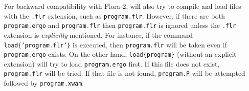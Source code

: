 For backward compatibility with Flora-2,
  \FLSYSTEM will also try to compile and load files with the \texttt{.flr}
  extension, such as \texttt{program.flr}. However, if there are both
  \texttt{program.ergo} and \texttt{program.flr} then \texttt{program.flr}
  is ignored unless the \texttt{.flr} extension is \emph{explicitly}
  mentioned. For instance, if the command \texttt{load\{'program.flr'\}}
  is executed, then \texttt{program.flr} will be taken even if
  \texttt{program.ergo} exists. On the other hand,
  \texttt{load\{program\}} (without an explicit extension)
  will try to load \texttt{program.ergo}
  first. If this file does not exist, \texttt{program.flr} will be tried.
  If that file is not found, \texttt{program.P} will be attempted followed by
  \texttt{program.xwam}.

